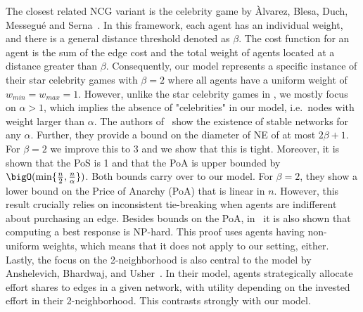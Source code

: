The closest related NCG variant is the celebrity game by {\`A}lvarez, Blesa, Duch, Messegu{\'e} and Serna~\cite{ABDMS16celebrity}.
In this framework, each agent has an individual weight, and there is a general distance threshold denoted as $\beta$. The cost function for an agent is the sum of the edge cost and the total weight of agents located at a distance greater than $\beta$. Consequently, our model represents a specific instance of their star celebrity games with $\beta=2$ where all agents have a uniform weight of $w_{min}=w_{max}=1$. However, unlike the star celebrity games in \cite{ABDMS16celebrity}, we mostly focus on $\alpha > 1$, which implies the absence of "celebrities" in our model, i.e.\ nodes with weight larger than $\alpha$.
The authors of~\cite{ABDMS16celebrity} show the existence of stable networks for any $\alpha$. Further, they provide a bound on the diameter of NE of at most $2\beta+1$. For $\beta=2$ we improve this to $3$ and we show that this is tight. Moreover, it is shown that the PoS is 1 and that the PoA is upper bounded by $\bigO(\min\{\frac{n}{2},\frac{n}{\alpha}\})$. Both bounds carry over to our model. 
For $\beta=2$, they show a lower bound on the Price of Anarchy (PoA) that is linear in $n$. However, this result crucially relies on inconsistent tie-breaking when agents are indifferent about purchasing an edge. 
Besides bounds on the PoA, in~\cite{ABDMS16celebrity} it is also shown that computing a best response is NP-hard. This proof uses agents having non-uniform weights, which means that it does not apply to our setting, either.
Lastly, the focus on the 2-neighborhood is also central to the model by Anshelevich, Bhardwaj, and Usher~\cite{AnshelevichBU15}. In their model, agents strategically allocate effort shares to edges in a given network, with utility depending on the invested effort in their 2-neighborhood. This contrasts strongly with our model.
